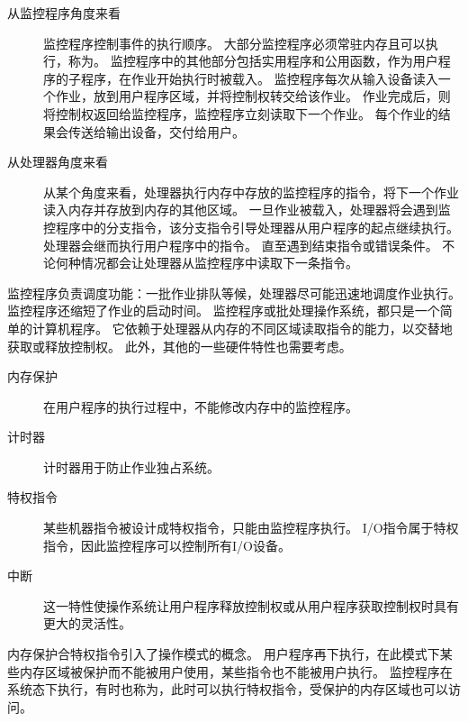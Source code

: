 {{        \begin{description}
            \item[从监控程序角度来看]
            {
                监控程序控制事件的执行顺序。
                大部分监控程序必须常驻内存且可以执行，称为。
                监控程序中的其他部分包括实用程序和公用函数，作为用户程序的子程序，在作业开始执行时被载入。
                监控程序每次从输入设备读入一个作业，放到用户程序区域，并将控制权转交给该作业。
                作业完成后，则将控制权返回给监控程序，监控程序立刻读取下一个作业。
                每个作业的结果会传送给输出设备，交付给用户。
            }
            \item[从处理器角度来看]
            {
                从某个角度来看，处理器执行内存中存放的监控程序的指令，将下一个作业读入内存并存放到内存的其他区域。
                一旦作业被载入，处理器将会遇到监控程序中的分支指令，该分支指令引导处理器从用户程序的起点继续执行。
                处理器会继而执行用户程序中的指令。
                直至遇到结束指令或错误条件。
                不论何种情况都会让处理器从监控程序中读取下一条指令。
            }
        \end{description}

        监控程序负责调度功能：一批作业排队等候，处理器尽可能迅速地调度作业执行。
        监控程序还缩短了作业的启动时间。
        监控程序或批处理操作系统，都只是一个简单的计算机程序。
        它依赖于处理器从内存的不同区域读取指令的能力，以交替地获取或释放控制权。
        此外，其他的一些硬件特性也需要考虑。

        \begin{description}
            \item[内存保护]
            {
                在用户程序的执行过程中，不能修改内存中的监控程序。
            }
            \item[计时器]
            {
                计时器用于防止作业独占系统。
            }
            \item[特权指令]
            {
                某些机器指令被设计成特权指令，只能由监控程序执行。
                I/O指令属于特权指令，因此监控程序可以控制所有I/O设备。
            }
            \item[中断]
            {
                这一特性使操作系统让用户程序释放控制权或从用户程序获取控制权时具有更大的灵活性。
            }
        \end{description}

        内存保护合特权指令引入了操作模式的概念。
        用户程序再下执行，在此模式下某些内存区域被保护而不能被用户使用，某些指令也不能被用户执行。
        监控程序在系统态下执行，有时也称为，此时可以执行特权指令，受保护的内存区域也可以访问。

}}
